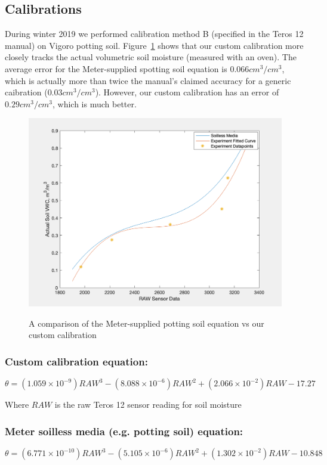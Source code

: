 \documentclass[12pt]{article}
\begin{document}
\subsection*{Calibrations}
During winter 2019 we performed calibration method B (specified in the
Teros 12 manual) on Vigoro potting soil. Figure~\ref{figure:calib}
shows that our custom calibration more closely tracks the actual
volumetric soil moisture (measured with an oven). The average error
for the Meter-supplied spotting soil equation is $0.066 cm^3/cm^3$,
which is actually more than twice the manual's claimed accuracy for a
generic caibration ($0.03 cm^3/cm^3$). However, our custom calibration
has an error of $0.29cm^3/cm^3$, which is much better.

\begin{figure}[h!]
  \centering
  \includegraphics[scale=0.8]{teros12calib.png}\\
  \caption{A comparison of the Meter-supplied potting soil equation vs our custom calibration}
  \label{figure:calib}
\end{figure}


\subsubsection*{Custom calibration equation:}
\begin{equation*}
\theta = (1.059\times 10^{-9})RAW^3 - (8.088\times 10^{-6})RAW^2 + (2.066\times 10^{-2})RAW - 17.27
\end{equation*}

Where $RAW$ is the raw Teros 12 sensor reading for soil moisture

\subsubsection*{Meter soilless media (e.g. potting soil) equation:}
\begin{equation*}
\theta =   (6.771\times 10^{-10})RAW^3 - (5.105\times 10^{-6})RAW^2 + (1.302\times 10^{-2})RAW - 10.848
\end{equation*}
\end{document}

